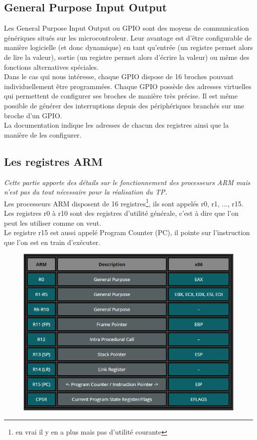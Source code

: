 \documentclass[a4paper,10pt]{article} %
\begin{document}
\subsection{\label{gpio}General Purpose Input Output}
Les General Purpose Input Output ou GPIO sont des moyens de communication génériques situés sur les microcontroleur. Leur avantage est d'être configurable de manière logicielle (et donc dynamique) en tant qu'entrée (un registre permet alors de lire la valeur), sortie (un registre permet alors d'écrire la valeur) ou même des fonctions alternatives spéciales.\\

Dans le cas qui nous intéresse, chaque GPIO dispose de 16 broches pouvant individuellement être programmées. Chaque GPIO possède des adresses virtuelles qui permettent de configurer ses broches de manière très précise. Il est même possible de générer des interruptions depuis des périphériques branchés sur une broche d'un GPIO.\\

La documentation indique les adresses de chacun des registres ainsi que la manière de les configurer.

\subsection{Les registres ARM}
\textit{Cette partie apporte des détails sur le fonctionnement des processeurs ARM mais n'est pas du tout nécessaire pour la réalisation du TP.}\\

Les processeurs ARM disposent de 16 registres\footnote{en vrai il y en a plus mais pas d'utilité courante}, ils sont appelés r0, r1, ..., r15.\\

Les registres r0 à r10 sont des registres d'utilité générale, c'est à dire que l'on peut les utiliser comme on veut.\\

Le registre r15 est aussi appelé Program Counter (PC), il pointe sur l'instruction que l'on est en train d’exécuter.\\
\begin{figure}
\includegraphics[scale=0.55]{assets/registers.png}
\end{figure}
\end{document}
